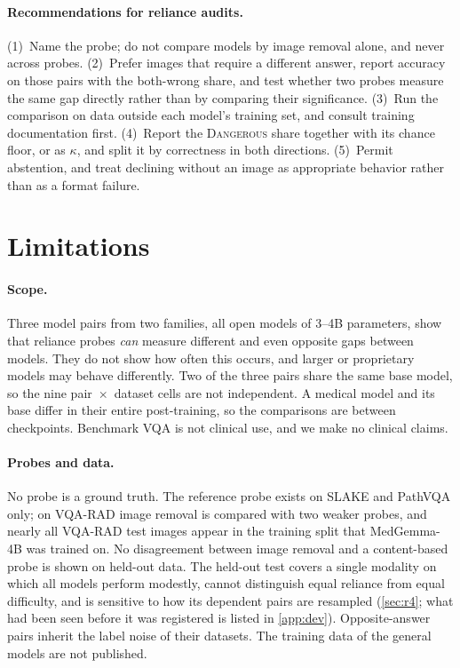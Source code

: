 \documentclass[10pt,twocolumn,letterpaper]{article}
\newcommand{\dang}{\textup{\textsc{Dangerous}}}
\begin{document}
\paragraph{Recommendations for reliance audits.} (1)~Name the probe; do not compare models by image removal alone,
and never across probes. (2)~Prefer images that require a different answer, report accuracy on those pairs with
the both-wrong share, and test whether two probes measure the same gap directly rather than by comparing
their significance. (3)~Run the comparison on data outside each model's training set, and consult training
documentation first. (4)~Report the \dang{} share together with its chance floor, or as $\kappa$, and split it by
correctness in both directions. (5)~Permit abstention, and treat declining without an image as appropriate
behavior rather than as a format failure.

\section{Limitations}
\label{sec:limits}
\paragraph{Scope.} Three model pairs from two families, all open models of 3--4B parameters, show that reliance
probes \emph{can} measure different and even opposite gaps between models. They do not show how often this
occurs, and larger or proprietary models may behave differently. Two of the three pairs share the same base model,
so the nine pair~$\times$~dataset cells are not independent. A medical model and its base differ in their entire
post-training, so the comparisons are between checkpoints. Benchmark VQA is not clinical use, and we make no
clinical claims.

\paragraph{Probes and data.} No probe is a ground truth. The reference probe exists on SLAKE and PathVQA only; on
VQA-RAD image removal is compared with two weaker probes, and nearly all VQA-RAD test images appear in the
training split that MedGemma-4B was trained on. No disagreement between image removal and a content-based probe is
shown on held-out data. The held-out test covers a single modality on which all models perform modestly, cannot
distinguish equal reliance from equal difficulty, and is sensitive to how its dependent pairs are resampled
(\cref{sec:r4}; what had been seen before it was registered is listed in \cref{app:dev}). Opposite-answer pairs inherit the label noise of their datasets. The training data of the general models are not
published.
\end{document}
